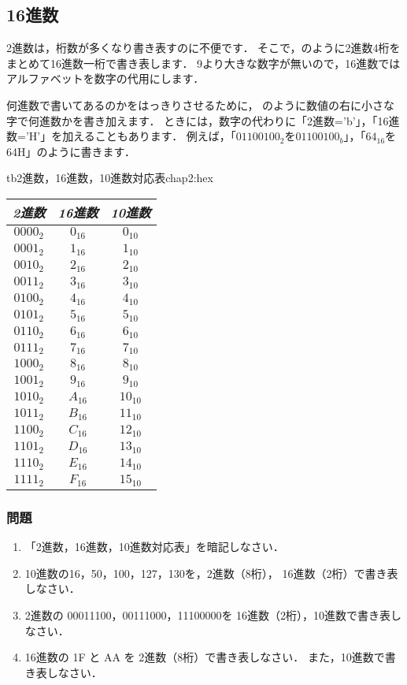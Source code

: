 \subsection{16進数}

2進数は，桁数が多くなり書き表すのに不便です．
そこで，のように2進数4桁をまとめて16進数一桁で書き表します．
9より大きな数字が無いので，16進数ではアルファベットを数字の代用にします．

何進数で書いてあるのかをはっきりさせるために，
のように数値の右に小さな字で何進数かを書き加えます．
ときには，数字の代わりに「2進数='b'」，「16進数='H'」を加えることもあります．
例えば，「$01100100_2$を$01100100_b$」，「$64_{16}$を64H」のように書きます．

\begin{mytable}{tb}{2進数，16進数，10進数対応表}{chap2:hex}
{\small\begin{tabular}{ c | c | c }
\hline
\hline
\emph{2進数} & \emph{16進数} & \emph{10進数} \\
\hline
$0000_2$ & $0_{16}$ & $0_{10}$ \\
$0001_2$ & $1_{16}$ & $1_{10}$ \\
$0010_2$ & $2_{16}$ & $2_{10}$ \\
$0011_2$ & $3_{16}$ & $3_{10}$ \\
$0100_2$ & $4_{16}$ & $4_{10}$ \\
$0101_2$ & $5_{16}$ & $5_{10}$ \\
$0110_2$ & $6_{16}$ & $6_{10}$ \\
$0111_2$ & $7_{16}$ & $7_{10}$ \\
$1000_2$ & $8_{16}$ & $8_{10}$ \\
$1001_2$ & $9_{16}$ & $9_{10}$ \\
$1010_2$ & $A_{16}$ & $10_{10}$ \\
$1011_2$ & $B_{16}$ & $11_{10}$ \\
$1100_2$ & $C_{16}$ & $12_{10}$ \\
$1101_2$ & $D_{16}$ & $13_{10}$ \\
$1110_2$ & $E_{16}$ & $14_{10}$ \\
$1111_2$ & $F_{16}$ & $15_{10}$ \\
\end{tabular}}
\end{mytable}

\begin{flushleft}
\subsubsection{問題}
\begin{enumerate}
\item
{}「2進数，16進数，10進数対応表」を暗記しなさい．
\item
10進数の16，50，100，127，130を，2進数（8桁），
16進数（2桁）で書き表しなさい．
\item
2進数の 00011100，00111000，11100000を
16進数（2桁），10進数で書き表しなさい．
\item
16進数の 1F と AA を
2進数（8桁）で書き表しなさい．
また，10進数で書き表しなさい．
\end{enumerate}
\end{flushleft}

